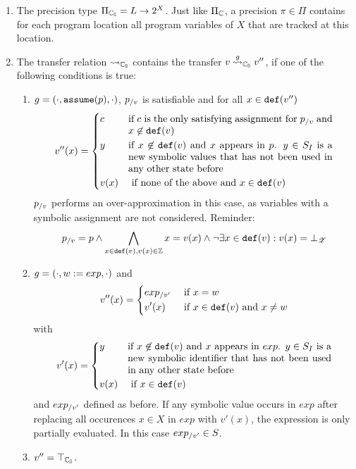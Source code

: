 \begin{enumerate}[leftmargin=*, label=\arabic*.]
\item The precision type $\Pi_{\mathbb{C_{S}}} = L \rightarrow 2^X$. Just like $\Pi_{\mathbb{C}}$, a precision $\pi \in \Pi$ contains for each program location all program variables of $X$ that are tracked at this location.

\item The transfer relation $\rightsquigarrow_{\mathbb{C_{S}}}$ contains the transfer $v \overset{g}{\rightsquigarrow}_{\mathbb{C_{S}}} v''$, if one of the following conditions is true:
	\begin{enumerate}[label = \alph*)]
		\item $g = (\cdot, \texttt{assume}(p), \cdot)$, $p_{/v}$ is satisfiable and for all $x \in \texttt{def}(v'')$
			\[ v''(x) = \begin{dcases}
				c & \parbox[t]{.6\textwidth}{ if $c$ is the only satisfying assignment for $p_\using{v}$ and $x \not\in \defRange(v)$}\\
				y & \parbox[t]{.6\textwidth}{ if $x \not\in \defRange(v)$ and $x$  appears in $p$. $y \in \symIds$ is a new symbolic values that has not been used in any other state before}\\
				v(x) & \text{ if none of the above and } x \in \defRange(v)
			\end{dcases}\]
			$p_{/v}$ performs an over-approximation in this case, as variables with a symbolic assignment are not considered.
			Reminder: \[p_{/v} = p \wedge \bigwedge\limits_{x \in \texttt{def}(v), v(x) \in \mathbb{Z}}  x = v(x) \wedge \neg \exists x \in \texttt{def}(v) : v(x) = \bot_{\mathscr{Z}}\]

		\item $g = (\cdot, w := exp, \cdot)$ and
			\[ v''(x) = \begin{dcases}
				exp_{/v'} & \text{ if } x = w\\
				v'(x) & \text{ if } x \in \texttt{def}(v) \text{ and } x \neq w
			\end{dcases}\]
			with
			\[v'(x) = \begin{dcases}
				y & \parbox[t]{.6\textwidth}{if $x \not \in \defRange(v)$ and $x$ appears in $exp$. $y \in \symIds$ is a new symbolic identifier that has not been used in any other state before}\\
				v(x) & \text{ if } x \in \defRange(v)
			\end{dcases}\]
			and $exp_{/v'}$ defined as before. If any symbolic value occurs in $exp$ after replacing all occurences $x \in X$ in $exp$ with $v'(x)$,
			the expression is only partially evaluated. In this case $exp_{/v'} \in S$.
		\item $v'' = \top_{\mathbb{C_{S}}}$.
	\end{enumerate}


\end{enumerate}
